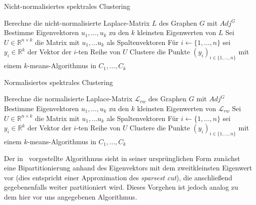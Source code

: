 \begin{algorithm}[]
\label{algo:non-normalized-spectral-clustering}
\caption{Nicht-normalisiertes spektrales Clustering~\cite{Luxburg07}}
	\DontPrintSemicolon
	
	\BlankLine
	
	Berechne die nicht-normalisierte Laplace-Matrix $L$ des Graphen $G$ mit $Adj^G$\;
	Bestimme Eigenvektoren $u_1, \dots, u_k$ zu den $k$ kleinsten Eigenwerten von $L$\;
	Sei $U \in \mathbb{R}^{n \times k}$ die Matrix mit $u_1, \dots u_k$ als Spaltenvektoren\;
	Für $i \leftarrow \{ 1, \dots, n \}$ sei $y_i \in \mathbb{R}^k$ der Vektor der $i$-ten Reihe von $U$\;
	Clustere die Punkte $(y_i)_{i \in \{1, \dots, n\}}$ mit einem $k$-means-Algorithmus in $C_1, \dots, C_k$
\end{algorithm}

\begin{algorithm}[]
\label{algo:normalized-spectral-clustering-shi-malik}
\caption{Normalisiertes spektrales Clustering~\cite{ShiM00}}
	\DontPrintSemicolon
	
	\BlankLine
	
	Berechne die normalisierte Laplace-Matrix $\mathcal{L}_{rw}$ des Graphen $G$ mit $Adj^G$\;
	Bestimme Eigenvektoren $u_1, \dots, u_k$ zu den $k$ kleinsten Eigenwerten von $\mathcal{L}_{rw}$\;
	Sei $U \in \mathbb{R}^{n \times k}$ die Matrix mit $u_1, \dots u_k$ als Spaltenvektoren\;
	Für $i \leftarrow \{ 1, \dots, n \}$ sei $y_i \in \mathbb{R}^k$ der Vektor der $i$-ten Reihe von $U$\;
	Clustere die Punkte $(y_i)_{i \in \{1, \dots, n\}}$ mit einem $k$-means-Algorithmus in $C_1, \dots, C_k$
\end{algorithm}
Der in~\cite{ShiM00} vorgestellte Algorithmus sieht in seiner ursprünglichen Form zunächst eine Bipartitionierung anhand des
Eigenvektors mit dem zweitkleinsten Eigenwert vor (dies entspricht einer Approximation des \emph{sparsest cut}),
die anschließend gegebenenfalls weiter partitioniert wird. Dieses Vorgehen ist jedoch analog zu dem hier vor uns angegebenen
Algorithmus.

